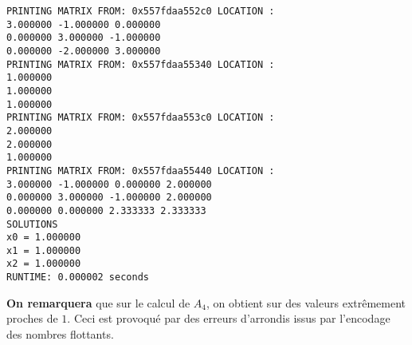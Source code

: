 \begin{lstlisting}[caption=Matrix 6 results]
PRINTING MATRIX FROM: 0x557fdaa552c0 LOCATION :
3.000000 -1.000000 0.000000
0.000000 3.000000 -1.000000
0.000000 -2.000000 3.000000
PRINTING MATRIX FROM: 0x557fdaa55340 LOCATION :
1.000000
1.000000
1.000000
PRINTING MATRIX FROM: 0x557fdaa553c0 LOCATION :
2.000000
2.000000
1.000000
PRINTING MATRIX FROM: 0x557fdaa55440 LOCATION :
3.000000 -1.000000 0.000000 2.000000
0.000000 3.000000 -1.000000 2.000000
0.000000 0.000000 2.333333 2.333333
SOLUTIONS
x0 = 1.000000
x1 = 1.000000
x2 = 1.000000
RUNTIME: 0.000002 seconds                       
\end{lstlisting}
\textbf{On remarquera} que sur le calcul de $A_4$, on obtient sur des valeurs extrêmement proches de $1$. Ceci est provoqué par des erreurs d'arrondis issus par l'encodage des nombres flottants.  